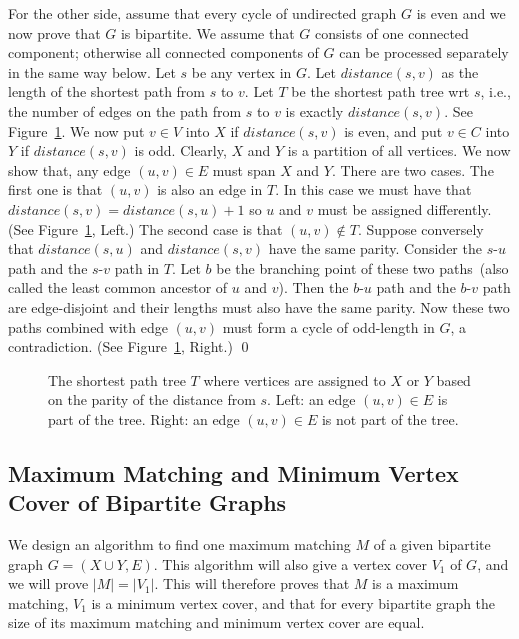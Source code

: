 For the other side, assume that every cycle of undirected graph $G$ is even
and we now prove that $G$ is bipartite. 
We assume that $G$ consists of one connected component; otherwise all connected components of $G$
can be processed separately in the same way below.
Let $s$ be any vertex in $G$.  Let $distance(s,v)$ as
the length of the shortest path from $s$ to $v$. 
Let $T$ be the shortest path tree wrt $s$, i.e.,
the number of edges on the path from $s$ to $v$ is exactly $distance(s,v)$.
See Figure~\ref{fig:spt}.
We now put $v\in V$ into $X$ if $distance(s,v)$ is even, 
and put $v\in C$ into $Y$ if $distance(s,v)$ is odd. 
Clearly, $X$ and $Y$ is a partition of all vertices.
We now show that, any edge $(u,v)\in E$ must span $X$ and $Y$.
There are two cases. The first one is that $(u,v)$ is also an edge in $T$.
In this case we must have that $distance(s,v) = distance(s,u) + 1$ so $u$ and $v$ must be assigned differently.
(See Figure~\ref{fig:spt}, Left.)
The second case is that $(u,v)\not\in T$.
Suppose conversely that $distance(s,u)$ and $distance(s,v)$ have the same parity. 
Consider the $s$-$u$ path and the $s$-$v$ path in $T$.
Let $b$ be the branching point of these two paths~(also called the least common ancestor of $u$ and $v$).
Then the $b$-$u$ path and the $b$-$v$ path are edge-disjoint and their lengths must also have the same parity.
Now these two paths combined with edge $(u,v)$ must form a cycle of odd-length in $G$, a contradiction. 
(See Figure~\ref{fig:spt}, Right.) \qed


\begin{figure}[!h]
\centering{}
\caption{The shortest path tree $T$ where vertices are assigned to $X$ or $Y$
based on the parity of the distance from $s$. Left: an edge $(u,v)\in E$ is part of the tree.
Right: an edge $(u,v)\in E$ is not part of the tree.}
\label{fig:spt}
\end{figure}



\subsection*{Maximum Matching and Minimum Vertex Cover of Bipartite Graphs}

We design an algorithm to find one maximum matching $M$ of a given bipartite graph $G = (X\cup Y, E)$.
This algorithm will also give a vertex cover $V_1$ of $G$, and we will prove $|M| = |V_1|$.
This will therefore proves that $M$ is a maximum matching, $V_1$ is a minimum vertex cover, and that
for every bipartite graph the size of its maximum matching and minimum vertex cover are equal.



